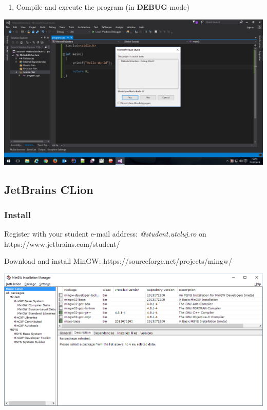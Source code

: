 \documentclass[../en-fa-lab.tex]{subfiles}
\begin{document}
\begin{enumerate}
\def\labelenumi{\arabic{enumi}.}
\setcounter{enumi}{4}
\item
  Compile and execute the program (in \textbf{DEBUG} mode)
\end{enumerate}

\includegraphics[width=\textwidth]{../Resources/lab0/image6.png}

\subsection{JetBrains CLion}\label{jetbrains-clion}

\subsubsection{Install}\label{install-1}

Register with your student e-mail address: \emph{@student.utcluj.ro} on
https://www.jetbrains.com/student/

Download and install MinGW: https://sourceforge.net/projects/mingw/

\includegraphics[width=\textwidth]{../Resources/lab0/image7.png}
\end{document}

